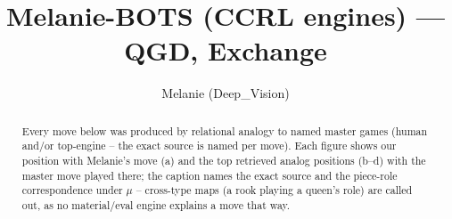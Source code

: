 \documentclass[11pt]{article}
\title{Melanie-BOTS (CCRL engines) — QGD, Exchange}
\author{Melanie (Deep\_Vision)}
\date{}
\begin{document}
\maketitle

\begin{abstract}Every move below was produced by relational analogy to named master games (human and/or top-engine -- the exact source is named per move). Each figure shows our position with Melanie's move (a) and the top retrieved analog positions (b--d) with the master move played there; the caption names the exact source and the piece-role correspondence under $\mu$ -- cross-type maps (a rook playing a queen's role) are called out, as no material/eval engine explains a move that way.\end{abstract}

\begin{figure}[p]\centering
\begin{subfigure}{0.46\textwidth}\centering
\resizebox{\linewidth}{!}{%
\newchessgame
\chessboard[
  setfen={rnbqk2r/pp2bppp/2p2n2/3p2B1/3P4/2NBP3/PP3PPP/R2QK1NR b KQkq - 1 7},
  showmover=false,
  pgfstyle=straightmove, color=movearrow, markmove={b8-d7}
]}
\caption{}
\end{subfigure}\hfill
\begin{subfigure}{0.46\textwidth}\centering
\resizebox{\linewidth}{!}{%
\newchessgame
\chessboard[
  setfen={rnbqk2r/pp2bppp/2p2n2/3p2B1/3P4/2NBP3/PP3PPP/R2QK1NR b KQkq - 1 7},
  showmover=false,
  pgfstyle=straightmove, color=movearrow, markmove={b8-d7}
]}
\caption{}
\end{subfigure}
\\[4pt]
\begin{subfigure}{0.46\textwidth}\centering
\resizebox{\linewidth}{!}{%
\newchessgame
\chessboard[
  setfen={rnbqk2r/pp2bppp/2p2n2/3p2B1/3P4/2NBP3/PP3PPP/R2QK1NR b KQkq - 1 7},
  showmover=false,
  pgfstyle=straightmove, color=movearrow, markmove={b8-d7}
]}
\caption{}
\end{subfigure}\hfill
\begin{subfigure}{0.46\textwidth}\centering
\resizebox{\linewidth}{!}{%
\newchessgame
\chessboard[
  setfen={rnbqk2r/pp2bppp/2p2n2/3p2B1/3P4/2NBP3/PP3PPP/R2QK1NR b KQkq - 2 7},
  showmover=false,
  pgfstyle=straightmove, color=movearrow, markmove={b8-d7}
]}
\caption{}
\end{subfigure}

\end{figure}
\end{document}
